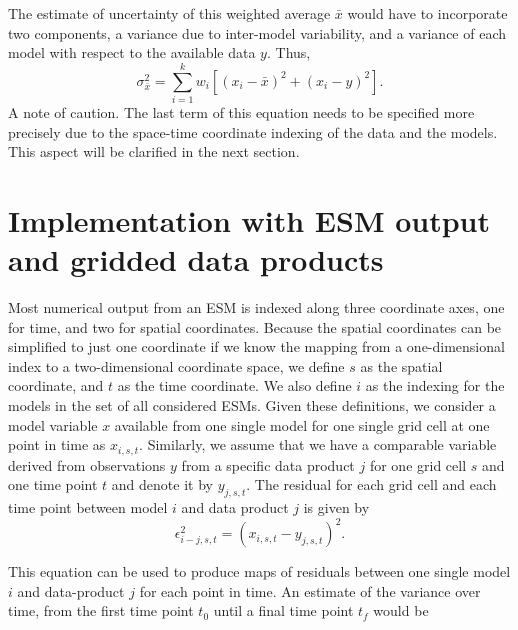 \documentclass[gmd, manuscript]{copernicus}
\begin{document}
The estimate of uncertainty of this weighted average $\bar{x}$ would have to incorporate two components, a variance due to inter-model variability, and a variance of each model with respect to the available data $y$. Thus,
\begin{equation}
\sigma_{\bar{x}}^2 =  \sum_{i=1}^k w_i \left[ (x_i -\bar{x})^2 + (x_i - y)^2 \right] .
\end{equation}
A note of caution. The last term of this equation needs to be specified more precisely due to the space-time coordinate indexing of the data and the models. This aspect will be clarified in the next section. 

\section{Implementation with ESM output and gridded data products}
Most numerical output from an ESM is indexed along three coordinate axes, one for time, and two for spatial coordinates. Because the spatial coordinates can be simplified to just one coordinate if we know the mapping from a one-dimensional index to a two-dimensional coordinate space, we define $s$ as the spatial coordinate, and $t$ as the time coordinate. We also define $i$ as the indexing for the models in the set of all considered ESMs. Given these definitions, we consider a model variable $x$ available from one single model for one single grid cell at one point in time as $x_{i, s, t}$. Similarly, we assume that we have a comparable variable derived from observations $y$ from a specific data product $j$ for one grid cell $s$ and one time point $t$ and denote it by $y_{j, s, t}$. The residual for each grid cell and each time point between model $i$ and data product $j$ is given by
\begin{equation}
\epsilon_{i-j, s, t}^2 =  (x_{i, s, t} - y_{j, s, t})^2.
\end{equation}

This equation can be used to produce maps of residuals between one single model $i$ and data-product $j$ for each point in time. An estimate of the variance over time, from the first time point $t_0$ until a final time point $t_f$ would be
\end{document}
